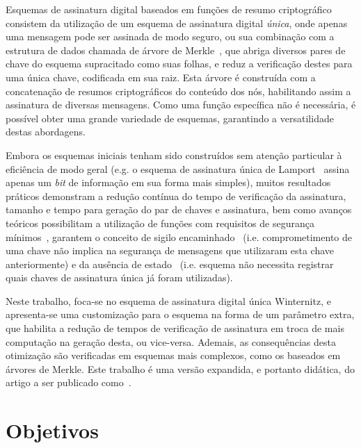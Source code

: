 \documentclass[12pt]{report}
\begin{document}
Esquemas de assinatura digital baseados em funções de resumo criptográfico
consistem da utilização de um esquema de assinatura digital \emph{única},
onde apenas uma mensagem pode ser assinada de modo seguro,
ou sua combinação com a estrutura de dados chamada de árvore de
Merkle~\cite{Merkle:1989:CDS:118209.118230}, que abriga diversos pares de chave do
esquema supracitado como suas folhas, e reduz a verificação destes para uma
única chave, codificada em sua raiz. Esta árvore é construída com a
concatenação de resumos criptográficos do conteúdo dos nós, habilitando assim a
assinatura de diversas mensagens. Como uma função específica não é necessária,
é possível obter uma grande variedade de esquemas, garantindo a versatilidade
destas abordagens.

Embora os esquemas iniciais tenham sido construídos sem atenção particular à
eficiência de modo geral (e.g. o esquema de assinatura única de Lamport~\cite{Lamport1979}
assina apenas um \emph{bit} de informação em sua forma mais
simples), muitos resultados práticos demonstram a redução contínua do tempo de
verificação da assinatura, tamanho e tempo para geração do par de chaves e
assinatura, bem como avanços teóricos possibilitam a utilização de funções com
requisitos de segurança mínimos~\cite{cryptoeprint:2017:965},
garantem o conceito de sigilo encaminhado~\cite{Buchmann:2011:XPF:2184003.2184011}
(i.e. comprometimento de uma chave não
implica na segurança de mensagens que utilizaram esta chave anteriormente) e da
ausência de estado~\cite{Bernstein2015} (i.e. esquema não necessita registrar
quais chaves de assinatura única já foram utilizadas).

Neste trabalho, foca-se no esquema de assinatura digital única Winternitz, e
apresenta-se uma customização para o esquema na forma de um parâmetro extra,
que habilita a redução de tempos de verificação de assinatura em troca de
mais computação na geração desta, ou vice-versa. Ademais, as consequências
desta otimização são verificadas em esquemas mais complexos, como os baseados
em árvores de Merkle. Este trabalho é uma versão expandida, e portanto didática,
do artigo a ser publicado como~\cite{Peri1806:Tuning}.

\section{Objetivos}
\end{document}
